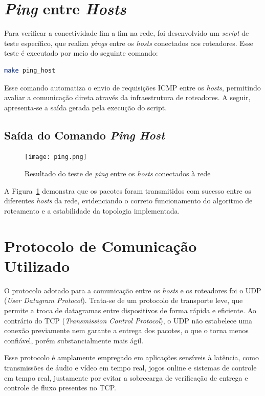 \documentclass[12pt,a4paper]{report}
\begin{document}
\section{\textit{Ping} entre \textit{Hosts}}

Para verificar a conectividade fim a fim na rede, foi desenvolvido um \textit{script} de teste específico, que realiza \textit{pings} entre os \textit{hosts} conectados aos roteadores. Esse teste é executado por meio do seguinte comando:

\begin{lstlisting}[language=bash]
make ping_host
\end{lstlisting}

Esse comando automatiza o envio de requisições ICMP entre os \textit{hosts}, permitindo avaliar a comunicação direta através da infraestrutura de roteadores. A seguir, apresenta-se a saída gerada pela execução do script.

\subsection{Saída do Comando \textit{Ping Host}}

\begin{figure}[h!]
    \centering
    \texttt{[image: ping.png]}
    \caption{Resultado do teste de \textit{ping} entre os \textit{hosts} conectados à rede}
    \label{fig:ping}
\end{figure}

A Figura~\ref{fig:ping} demonstra que os pacotes foram transmitidos com sucesso entre os diferentes \textit{hosts} da rede, evidenciando o correto funcionamento do algoritmo de roteamento e a estabilidade da topologia implementada.

\section{Protocolo de Comunicação Utilizado}

O protocolo adotado para a comunicação entre os \textit{hosts} e os roteadores foi o UDP (\textit{User Datagram Protocol}). Trata-se de um protocolo de transporte leve, que permite a troca de datagramas entre dispositivos de forma rápida e eficiente. Ao contrário do TCP (\textit{Transmission Control Protocol}), o UDP não estabelece uma conexão previamente nem garante a entrega dos pacotes, o que o torna menos confiável, porém substancialmente mais ágil.

Esse protocolo é amplamente empregado em aplicações sensíveis à latência, como transmissões de áudio e vídeo em tempo real, jogos online e sistemas de controle em tempo real, justamente por evitar a sobrecarga de verificação de entrega e controle de fluxo presentes no TCP.
\end{document}
